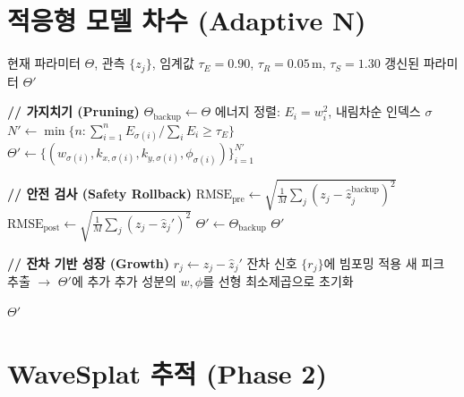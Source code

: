 \documentclass[11pt]{report}
\numberwithin{equation}{chapter}
\numberwithin{figure}{chapter}
\numberwithin{table}{chapter}
\begin{document}
\section{적응형 모델 차수 (Adaptive N)}
\label{app:alg_adaptive}

\begin{algorithm}[H]
\caption{적응형 모델 차수 알고리즘}
\label{alg:adaptive_n}
\begin{algorithmic}[1]
\REQUIRE 현재 파라미터 $\Theta$, 관측 $\{z_j\}$, 임계값 $\tau_E=0.90$, $\tau_R=0.05$\,m, $\tau_S=1.30$
\ENSURE 갱신된 파라미터 $\Theta'$

\STATE \textbf{// 가지치기 (Pruning)}
\STATE $\Theta_{\text{backup}} \leftarrow \Theta$ 
\STATE 에너지 정렬: $E_i = w_i^2$, 내림차순 인덱스 $\sigma$
\STATE $N' \leftarrow \min\{n : \sum_{i=1}^{n} E_{\sigma(i)} / \sum_i E_i \geq \tau_E\}$
\STATE $\Theta' \leftarrow \{(w_{\sigma(i)}, k_{x,\sigma(i)}, k_{y,\sigma(i)}, \phi_{\sigma(i)})\}_{i=1}^{N'}$

\STATE \textbf{// 안전 검사 (Safety Rollback)}
\STATE $\text{RMSE}_{\text{pre}} \leftarrow \sqrt{\frac{1}{M}\sum_j(z_j - \hat{z}_j^{\text{backup}})^2}$
\STATE $\text{RMSE}_{\text{post}} \leftarrow \sqrt{\frac{1}{M}\sum_j(z_j - \hat{z}_j')^2}$
  \STATE $\Theta' \leftarrow \Theta_{\text{backup}}$ 
  \RETURN $\Theta'$
\ENDIF

\STATE \textbf{// 잔차 기반 성장 (Growth)}
\STATE $r_j \leftarrow z_j - \hat{z}_j'$ 
  \STATE 잔차 신호 $\{r_j\}$에 빔포밍 적용
  \STATE 새 피크 추출 $\to$ $\Theta'$에 추가
  \STATE 추가 성분의 $w, \phi$를 선형 최소제곱으로 초기화
\ENDIF

\RETURN $\Theta'$
\end{algorithmic}
\end{algorithm}

\section{WaveSplat 추적 (Phase 2)}
\label{app:alg_tracking}
\end{document}
